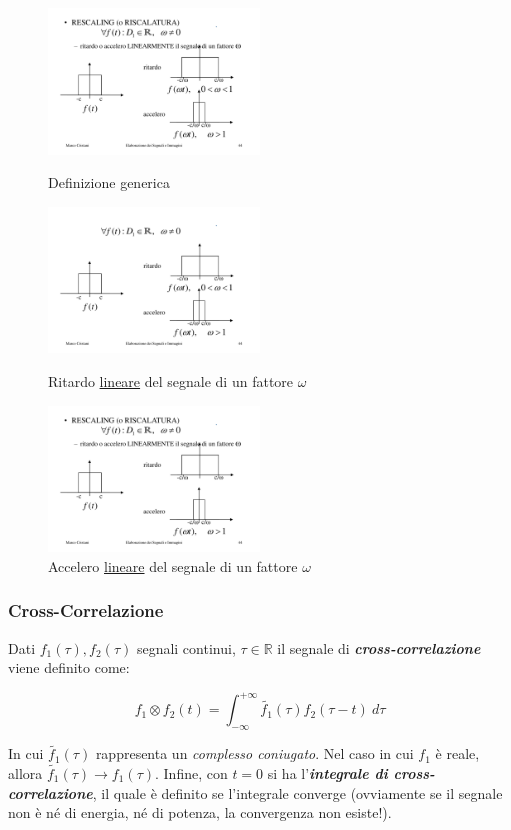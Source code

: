 \documentclass[a4paper]{article}
\begin{document}
	\begin{figure}[!htp]
		\centering
		\includegraphics[width=0.5\textwidth]{img/rescaling.pdf}
		\caption{Definizione generica}\label{rescaling}
		\includegraphics[width=0.5\textwidth]{img/rescaling_ritardo.pdf}
		\caption{Ritardo \underline{lineare} del segnale di un fattore $\omega$}\label{rescaling_ritardo}
		\includegraphics[width=0.5\textwidth]{img/rescaling_accelero.pdf}
		\caption{Accelero \underline{lineare} del segnale di un fattore $\omega$}\label{rescaling_accelero}
	\end{figure}

	\subsubsection{Cross-Correlazione}
	
	Dati $f_1(\tau), f_2(\tau)$ segnali continui, $\tau\in\mathbb{R}$ il segnale di \textbf{\emph{cross-correlazione}} viene definito come:
	
	\begin{equation*}
		\displaystyle f_1 \otimes f_2 (t) = \int_{-\infty}^{+\infty} \tilde{f_1}(\tau) f_2(\tau - t)\: d\tau
	\end{equation*}

	\noindent
	In cui $\tilde{f_1}(\tau)$ rappresenta un \emph{complesso coniugato}. Nel caso in cui $f_1$ è reale, allora $\tilde{f_1}(\tau) \rightarrow f_1(\tau)$. \newline
	Infine, con $t = 0$ si ha l'\textbf{\emph{integrale di cross-correlazione}}, il quale è definito se l'integrale converge (ovviamente se il segnale non è né di energia, né di potenza, la convergenza non esiste!).
\end{document}
